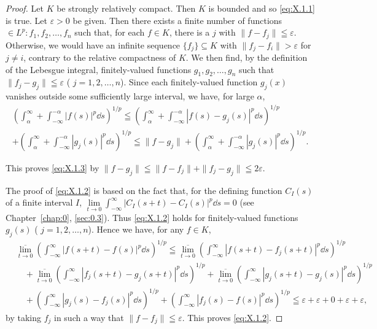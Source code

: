 \begin{proof}
 Let $K$ be strongly relatively compact. Then $K$ is bounded and so \eqref{eq:X.1.1} is true. Let $\varepsilon > 0$ be given. Then there exists a finite number of functions $\in L^p: f_1, f_2, \ldots, f_n$ such that, for each $f \in K$, there is a $j$ with $\|f - f_j\| \leqq \varepsilon$. Otherwise, we would have an infinite sequence $\{f_j\} \subseteq K$ with $\|f_j - f_i\| > \varepsilon$ for $j \neq i$, contrary to the relative compactness of $K$. We then find, by the definition of the Lebesgue integral, finitely-valued functions $g_1, g_2, \ldots, g_n$ such that $\|f_j - g_j\| \leqq \varepsilon$ ( $j = 1, 2, \ldots, n$). Since each finitely-valued function $g_j(x)$ vanishes outside some sufficiently large interval, we have, for large $\alpha$, 
\[
\begin{gathered}
\left(\int_{\alpha} ^{\infty} + \int_{- \infty} ^{- \alpha} | f (s) | ^{p} \dd s\right) ^{1/p} \leqq \left(\int_{\alpha} ^{\infty} + \int_{- \infty} ^{- \alpha} | f (s) - g _{j} (s) | ^{p} \dd s\right) ^{1/p}
\\
+ \left(\int_{\alpha} ^{\infty} + \int_{- \infty} ^{- \alpha} | g _{j} (s) | ^{p} \dd s\right) ^{1/p} \leqq \| f - g _{j} \| + \left(\int_{\alpha} ^{\infty} + \int_{- \infty} ^{- \alpha} | g _{j} (s) | ^{p} \dd s\right) ^{1/p}. \end{gathered}
\]

This proves \eqref{eq:X.1.3} by $\| f - g_j\| \leqq \| f - f_j\| + \| f_j - g_j\| \leqq 2\varepsilon$. 

The proof of \eqref{eq:X.1.2} is based on the fact that, for the defining function $C_I(s)$ of a finite interval $I$, $\lim\limits_{t \to 0} \int_{-\infty}^{\infty} |C_I(s + t) - C_I(s)|^p \dd s = 0$ (see Chapter~\ref{chap:0}, \ref{sec:0.3}). Thus \eqref{eq:X.1.2} holds for finitely-valued functions $g_j(s)$ ( $j = 1, 2, \ldots, n$). Hence we have, for any $f \in K$, 
\[
\begin{aligned}
&\overline {{\lim\limits _{t \to 0}}} \left(\int_{- \infty} ^{\infty} | f (s + t) - f (s) | ^{p} \dd s\right) ^{1/p} \leqq {} \overline {{\lim\limits _{t \to 0}}} \left(\int_{- \infty} ^{\infty} | f (s + t) - f _{j} (s + t) | ^{p} \dd s\right) ^{1/p}
\\
&\quad + \overline {{\lim\limits _{t \to 0}}} \left(\int_{- \infty} ^{\infty} | f _{j} (s + t) - g _{j} (s + t) | ^{p} \dd s\right) ^{1/p} + \overline {{\lim\limits _{t \to 0}}} \left(\int_{- \infty} ^{\infty} | g _{j} (s + t) - g _{j} (s) | ^{p} \dd s\right) ^{1/p}
\\
&\quad + \left(\int_{- \infty} ^{\infty} | g _{j} (s) - f _{j} (s) | ^{p} \dd s\right) ^{1/p} + \left(\int_{- \infty} ^{\infty} | f _{j} (s) - f (s) | ^{p} \dd s\right) ^{1/p} \leqq {} \varepsilon + \varepsilon + 0 + \varepsilon + \varepsilon ,
\end{aligned}
\]
by taking $f_{j}$ in such a way that $\| f - f_{j}\| \leqq \varepsilon$. This proves \eqref{eq:X.1.2}. 
\end{proof}


